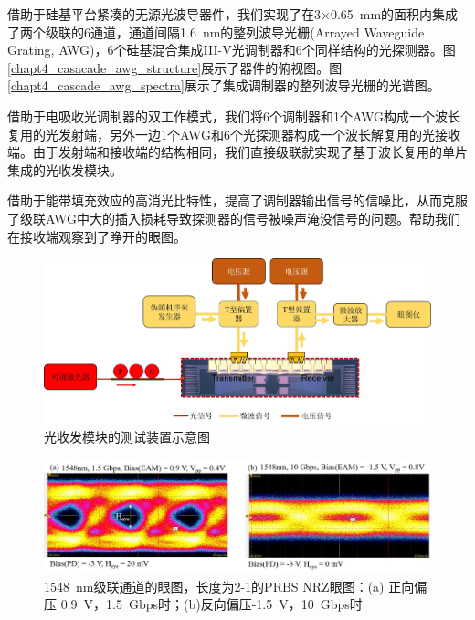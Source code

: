 借助于硅基平台紧凑的无源光波导器件，我们实现了在3$\times$0.65~mm的面积内集成了两个级联的6通道，通道间隔1.6~nm的整列波导光栅(Arrayed Waveguide Grating, AWG)，6个硅基混合集成III-V光调制器和6个同样结构的光探测器。图\ref{chapt4_casacade_awg_structure}展示了器件的俯视图。图\ref{chapt4_cascade_awg_spectra}展示了集成调制器的整列波导光栅的光谱图。

借助于电吸收光调制器的双工作模式，我们将6个调制器和1个AWG构成一个波长复用的光发射端，另外一边1个AWG和6个光探测器构成一个波长解复用的光接收端。由于发射端和接收端的结构相同，我们直接级联就实现了基于波长复用的单片集成的光收发模块。

借助于能带填充效应的高消光比特性，提高了调制器输出信号的信噪比，从而克服了级联AWG中大的插入损耗导致探测器的信号被噪声淹没信号的问题。帮助我们在接收端观察到了睁开的眼图。

\begin{figure}[htb]
	\centering
	\includegraphics[width=15cm]{./Pictures/chapt4_tranciever_measure.jpg}
	\caption{光收发模块的测试装置示意图}
	\label{chapt4_tranciever_measure}
\end{figure}

\begin{figure}[htb]
	\centering
	\includegraphics[width=15cm]{./Pictures/chapt4_cascade_eyediagram.jpg}
	\caption{1548~nm级联通道的眼图，长度为2-1的PRBS NRZ眼图：(a) 正向偏压 0.9~V，1.5~Gbps时；(b)反向偏压-1.5~V，10~Gbps时}
	\label{chapt4_cascade_eyediagram}
\end{figure}

